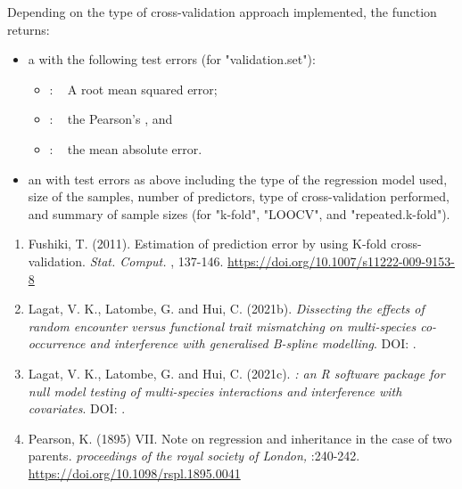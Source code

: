 \documentclass[a4paper]{book}
\begin{document}
\begin{Value}
Depending on the type of cross-validation approach implemented, the 
function returns:
\begin{itemize}

\item{} a  with the following test errors (for "validation.set"):
\begin{itemize}

\item{} :   A root mean squared error;
\item{} :   the Pearson's , and
\item{} :   the mean absolute error.

\end{itemize}

\item{} an  with test errors as above including the type of the
regression model used, size of the samples, number of predictors,
type of cross-validation performed, and summary of sample sizes
(for "k-fold", "LOOCV", and "repeated.k-fold").

\end{itemize}

\end{Value}
%
\begin{References}\relax
\begin{enumerate}


\item{} Fushiki, T. (2011). Estimation of prediction error by using K-fold cross-validation.
\emph{Stat. Comput.} , 137-146. \url{https://doi.org/10.1007/s11222-009-9153-8}

\item{} Lagat, V. K., Latombe, G. and Hui, C. (2021b). \emph{Dissecting the effects of random
encounter versus functional trait mismatching on multi-species co-occurrence and
interference with generalised B-spline modelling}. DOI: .

\item{} Lagat, V. K., Latombe, G. and Hui, C. (2021c). \emph{: an R software package
for null model testing of multi-species interactions and interference with
covariates}. DOI: .

\item{} Pearson, K. (1895) VII. Note on regression and inheritance in the
case of two parents. \emph{proceedings of the royal society of London,} :240-242.
\url{https://doi.org/10.1098/rspl.1895.0041}

\end{enumerate}

\end{References}
\end{document}
